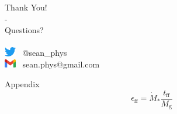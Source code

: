 \documentclass[aspectratio=169]{beamer}
\begin{document}
%
%
%
%
%
\begin{frame}{}
	\centering Thank You! \\ - \\ Questions? \\
	~ \\
	\includegraphics[width=0.5cm]{../images/twitter_icon.jpeg}~ @sean\_phys \\
	 \includegraphics[width=0.5cm]{../images/gmail_icon.jpeg}~ sean.phys@gmail.com
\end{frame}

\begin{frame}{Appendix}
	\begin{equation}\label{eqn:sfe}
		\epsilon_{\text{ff}} = \dot{M}_{*}\frac{t_{\text{ff}}}{M_{\text{g}}}
	\end{equation}
\end{frame}
\end{document}
